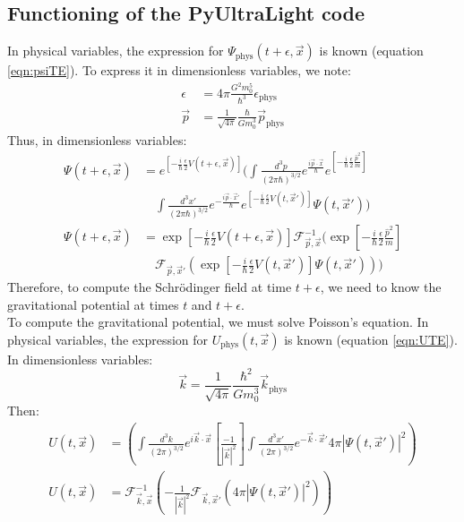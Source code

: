 \documentclass[12pt]{article}
\begin{document}
\subsection*{Functioning of the PyUltraLight code}
In physical variables, the expression for \( \Psi_{\text{phys}}(t+\epsilon,\vec{x}) \) is known (equation \ref{eqn:psiTE}). To express it in dimensionless variables, we note:
\begin{align}
   \epsilon&=4\pi \frac{G^2 m_0^5}{\hbar^3}\epsilon_{\text{phys}} \\
   \vec{p}&=\frac{1}{\sqrt{4\pi}}\frac{\hbar}{Gm_0^3}\vec{p}_{\text{phys}}
\end{align}
Thus, in dimensionless variables:
\begin{align}
    \Psi(t+\epsilon,\vec{x}) &= e^{\left[-\frac{i}{\hbar} \frac{\epsilon}{2} V(t+\epsilon,\vec{x}) \right]} 
    \bigg(\int \frac{d^{3}p}{(2 \pi \hbar)^{3/2}}e^{\frac{i\vec{p}\cdot \vec{x}}{\hbar}}e^{\left[-\frac{i}{\hbar}\frac{\epsilon}{2}\frac{\hat{p}^2}{m}  \right]} \nonumber \\
    &\quad \int \frac{d^{3}x'}{(2\pi \hbar)^{3/2}}e^{-\frac{i\vec{p}\cdot \vec{x}'}{\hbar}}e^{\left[ -\frac{i}{\hbar}\frac{\epsilon}{2}V(t,\vec{x}')\right]} \Psi(t,\vec{x}') \bigg) \\
    \Psi(t+\epsilon,\vec{x}) &= \exp\left[-\frac{i}{\hbar}\frac{\epsilon}{2}V(t+\epsilon,\vec{x}) \right] 
    \mathcal{F}^{-1}_{\vec{p},\vec{x}}\bigg(\exp\left[-\frac{i}{\hbar}\frac{\epsilon}{2}\frac{\hat{p}^2}{m} \right] \nonumber \\
    &\quad \mathcal{F}_{\vec{p},\vec{x}'} \left( \exp\left[-\frac{i}{\hbar}\frac{\epsilon}{2}V(t,\vec{x}') \right] \Psi(t,\vec{x}') \right) \bigg)
\label{eqn:Psi PyUltralight}
\end{align}
Therefore, to compute the Schrödinger field at time \( t+\epsilon \), we need to know the gravitational potential at times \( t \) and \( t+\epsilon \).\\
To compute the gravitational potential, we must solve Poisson’s equation. In physical variables, the expression for \( U_{\text{phys}}(t,\vec{x}) \) is known (equation \ref{eqn:UTE}). In dimensionless variables:
\begin{equation}
    \vec{k}=\frac{1}{\sqrt{4\pi}}\frac{\hbar^{2}}{Gm_0^{3}}\vec{k}_\text{phys}
\end{equation}
Then:
\begin{align}
    U(t,\vec{x})&=\left(\int \frac{d^3 k}{(2\pi)^{3/2}}e^{i\vec{k}\cdot \vec{x}} \left[\frac{-1}{|\vec{k}|^2} \right]\int \frac{d^{3}x'}{(2\pi)^{3/2}}e^{-\vec{k}\cdot \vec{x}'}4\pi |\Psi(t,\vec{x}')|^2 \right) \\
    U(t,\vec{x})&=\mathcal{F}_{\vec{k},\vec{x}}^{-1}\left(-\frac{1}{|\vec{k}|^2}\mathcal{F}_{\vec{k},\vec{x}'}\left(4\pi |\Psi(t,\vec{x}')|^2 \right) \right) \label{eqn:U PyUltralight}
\end{align}
\end{document}
